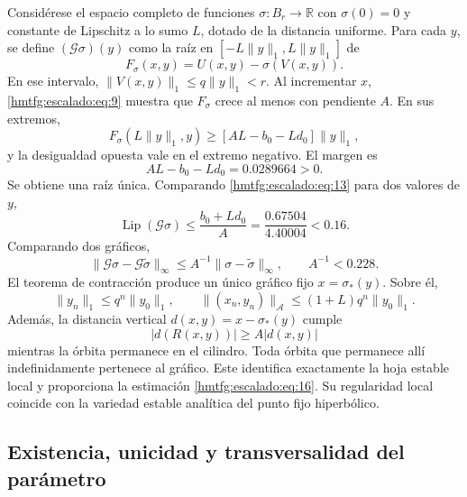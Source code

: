Considérese el espacio completo de funciones \(\sigma:B_r\to\mathbb R\) con \(\sigma(0)=0\) y constante de Lipschitz a lo sumo \(L\), dotado de la distancia uniforme. Para cada \(y\), se define \((\mathcal G\sigma)(y)\) como la raíz en \([-L\|y\|_1,L\|y\|_1]\) de
\begin{equation}
F_\sigma(x,y)=U(x,y)-\sigma(V(x,y)).
\label{hmtfg:escalado:eq:13}
\end{equation}
En ese intervalo, \(\|V(x,y)\|_1\le q\|y\|_1<r\). Al incrementar \(x\), \eqref{hmtfg:escalado:eq:9} muestra que \(F_\sigma\) crece al menos con pendiente \(A\). En sus extremos,
\[
F_\sigma(L\|y\|_1,y)
\ge[AL-b_0-Ld_0]\|y\|_1,
\]
y la desigualdad opuesta vale en el extremo negativo. El margen es
\begin{equation}
AL-b_0-Ld_0=0.0289664>0.
\label{hmtfg:escalado:eq:14}
\end{equation}
Se obtiene una raíz única. Comparando \eqref{hmtfg:escalado:eq:13} para dos valores de \(y\),
\[
\operatorname{Lip}(\mathcal G\sigma)
\le\frac{b_0+Ld_0}{A}
=\frac{0.67504}{4.40004}<0.16.
\]
Comparando dos gráficos,
\begin{equation}
\|\mathcal G\sigma-\mathcal G\widetilde\sigma\|_\infty
\le A^{-1}\|\sigma-\widetilde\sigma\|_\infty,
\qquad A^{-1}<0.228.
\label{hmtfg:escalado:eq:15}
\end{equation}
El teorema de contracción produce un único gráfico fijo \(x=\sigma_*(y)\). Sobre él,
\begin{equation}
\|y_n\|_1\le q^n\|y_0\|_1,
\qquad
\|(x_n,y_n)\|_{\mathcal A}\le(1+L)q^n\|y_0\|_1.
\label{hmtfg:escalado:eq:16}
\end{equation}
Además, la distancia vertical \(d(x,y)=x-\sigma_*(y)\) cumple
\[
|d(R(x,y))|\ge A|d(x,y)|
\]
mientras la órbita permanece en el cilindro. Toda órbita que permanece allí indefinidamente pertenece al gráfico. Este identifica exactamente la hoja estable local y proporciona la estimación \eqref{hmtfg:escalado:eq:16}. Su regularidad local coincide con la variedad estable analítica del punto fijo hiperbólico.


\subsection{Existencia, unicidad y transversalidad del parámetro}
\label{hmtfg:escalado:6}

